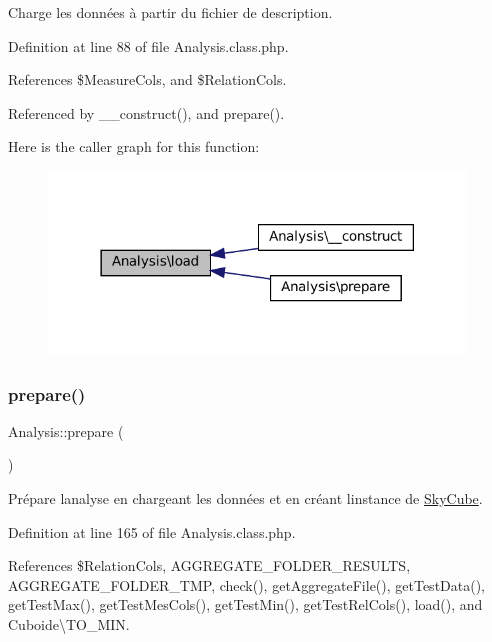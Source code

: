 Charge les données à partir du fichier de description. 

Definition at line 88 of file Analysis.\+class.\+php.



References \$\+Measure\+Cols, and \$\+Relation\+Cols.



Referenced by \+\_\+\+\_\+construct(), and prepare().

Here is the caller graph for this function\+:\nopagebreak
\begin{figure}[H]
\begin{center}
\leavevmode
\includegraphics[width=314pt]{class_analysis_a212eda5284530c04b1e068cf53387215_icgraph}
\end{center}
\end{figure}
\mbox{\label{class_analysis_ab640c304003ffe30395f331260b4c83c}} 
\subsubsection{\texorpdfstring{prepare()}{prepare()}}
{\footnotesize\ttfamily Analysis\+::prepare (\begin{DoxyParamCaption}{ }\end{DoxyParamCaption})}

Prépare l\textquotesingle{}analyse en chargeant les données et en créant l\textquotesingle{}instance de \hyperlink{class_sky_cube}{Sky\+Cube}. 

Definition at line 165 of file Analysis.\+class.\+php.



References \$\+Relation\+Cols, A\+G\+G\+R\+E\+G\+A\+T\+E\+\_\+\+F\+O\+L\+D\+E\+R\+\_\+\+R\+E\+S\+U\+L\+TS, A\+G\+G\+R\+E\+G\+A\+T\+E\+\_\+\+F\+O\+L\+D\+E\+R\+\_\+\+T\+MP, check(), get\+Aggregate\+File(), get\+Test\+Data(), get\+Test\+Max(), get\+Test\+Mes\+Cols(), get\+Test\+Min(), get\+Test\+Rel\+Cols(), load(), and Cuboide\textbackslash{}\+T\+O\+\_\+\+M\+IN.

